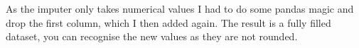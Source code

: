 \documentclass[letterpaper,10pt,english]{jupyterBook}
\begin{document}
\sphinxAtStartPar
As the imputer only takes numerical values I had to do some pandas magic and drop the first column, which I then added again. The result is a fully filled dataset, you can recognise the new values as they are not rounded.

\begin{sphinxVerbatim}[commandchars=\\\{\}]
    \PYG{p}{[}\PYG{p}{]} 
\end{sphinxVerbatim}
\end{document}

